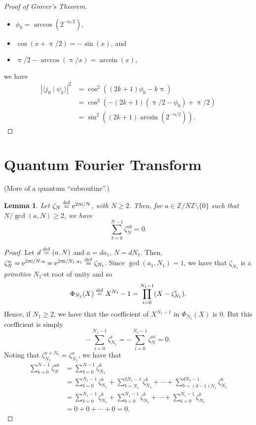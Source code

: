 \documentclass[12pt]{amsart}
\theoremstyle{plain}
\newtheorem{lemma}[theorem]{Lemma}
\theoremstyle{definition}
\theoremstyle{remarks}
\newcommand{\Z}{\mathbb{Z}}
\newcommand{\me}{\mathrm{e}}
\newcommand{\mi}{\mathrm{i}}
\newcommand{\mpi}{\uppi}
\newcommand{\idef}{\overset{{\rm def}}{=}}
\newcommand{\abs}[1]{\left| #1 \right|}
\begin{document}
\begin{proof}[Proof of Grover's Theorem]
\begin{itemize}
  \item $\phi_0 = \arccos(2^{-n/2})$,

  \item $\cos(x + \mpi/2) = -\sin(x)$, and

  \item $\mpi/2 - \arccos(\mpi/x) = \arcsin(x)$,

  \end{itemize}
  we have
  \begin{align*}
    \abs{\langle j_0 \mid \psi_k \rangle}^2
    &= \cos^2((2k+1)\phi_0 - k\mpi) \\
    &=\cos^2(-(2k+1)(\mpi/2 - \phi_0) + \mpi/2) \\
    &= \sin^2((2k+1) \arcsin(2^{-n/2})).
  \end{align*}


\end{proof}


\section{Quantum Fourier Transform}


(More of a quantum ``subroutine''.)


\begin{lemma}\label{lemma:expsum}
  Let $\zeta_N \idef \me^{2 \mpi \mi/N}$, with $N \geq 2$.  Then, for $a \in \Z/{N}\Z \setminus \{0\}$ such that $N/\gcd(a, N) \geq 2$, we have
  \[
    \sum_{b=0}^{N-1} \zeta_N^{ab} = 0.
  \]
\end{lemma}

\begin{proof}
  Let $d \idef (a, N)$ and $a = d a_1$, $N = d N_1$.  Then, $\zeta_N^a = \me^{2 \mpi \mi/N \cdot a} = \me^{2 \mpi \mi/N_1 \cdot a_1} \idef \zeta_{N_1}$.  Since $\gcd(a_1, N_1) = 1$, we have that $\zeta_{N_1}$ is a \emph{primitive} $N_1$-st root of unity and so
  \[
   \Phi_{N_1}(X) \idef  X^{N_1} - 1 = \prod_{i=0}^{N_1 - 1} (X - \zeta_{N_1}^i).
  \]
  Hence, if $N_1 \geq 2$, we have that the coefficient of $X^{N_1 - 1}$ in $\Phi_{N_1}(X)$ is $0$.  But this coefficient is simply
  \[
    - \sum_{i=0}^{N_1-1} \zeta_{N_1}^{i} = - \sum_{i=0}^{N_1-1} \zeta_N^{ai} = 0.
  \]
  Noting that $\zeta_{N_1}^{x + N_1} = \zeta_{N_1}^x$, we have that
  \begin{align*}
    \sum_{b=0}^{N-1} \zeta_N^{ab}
    &= \sum_{b=0}^{N-1} \zeta_{N_1}^b \\
    & = \sum_{b=0}^{N_1-1} \zeta_{N_1}^b + \sum_{b=N_1}^{2N_1-1} \zeta_{N_1}^b + \cdots + \sum_{b=(d-1)N_1}^{dN_1-1} \zeta_{N_1}^b \\
    &= \sum_{b=0}^{N_1-1} \zeta_{N_1}^b + \sum_{b=0}^{N_1-1} \zeta_{N_1}^b + \cdots + \sum_{b=0}^{N_1-1} \zeta_{N_1}^b \\
    &= 0 + 0 + \cdots + 0 = 0.
  \end{align*}
\end{proof}
\end{document}
